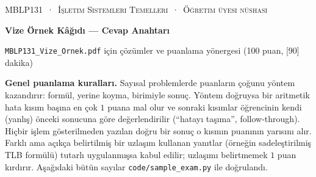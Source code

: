 \setlength{\emergencystretch}{3em}
\newcommand{\gantt}[2]{%
\begin{tikzpicture}[x=#1cm,y=1cm]
\foreach \p/\a/\b in {#2} {
  \fill[col\p] (\a,0) rectangle (\b,0.62);
  \draw[white,line width=1.2pt] (\a,0) -- (\a,0.62);
  \node[font=\small\bfseries,text=txt\p] at ({(\a+\b)/2},0.31) {\p};
  \draw[muted] (\a,0) -- (\a,-0.1) node[below,font=\scriptsize,text=muted,inner sep=1.5pt] {\a};
  \draw[muted] (\b,0) -- (\b,-0.1) node[below,font=\scriptsize,text=muted,inner sep=1.5pt] {\b};
}
\end{tikzpicture}}
\newcommand{\gen}[1]{}

\thispagestyle{empty}
\begin{tcolorbox}[enhanced,colback=dark,colframe=dark,arc=0pt,boxrule=0pt,
  left=18pt,right=18pt,top=14pt,bottom=14pt,coltext=white]
{\small\color{mint}\textsc{MBLP131 \,·\, İşletim Sistemleri Temelleri \,·\, Öğretim üyesi nüshası}}\par\smallskip
{\headfont\fontsize{22}{26}\selectfont\bfseries Vize Örnek Kâğıdı --- Cevap Anahtarı}\par\smallskip
{\small \texttt{MBLP131\_Vize\_Ornek.pdf} için çözümler ve puanlama yönergesi (100 puan, [90] dakika)}
\end{tcolorbox}

\textbf{Genel puanlama kuralları.} Sayısal problemlerde puanların çoğunu yöntem kazandırır: formül, yerine koyma, birimiyle sonuç. Yöntem doğruysa bir aritmetik hata kısım başına en çok $1$ puana mal olur ve sonraki kısımlar öğrencinin kendi (yanlış) önceki sonucuna göre değerlendirilir (``hatayı taşıma'', follow-through). Hiçbir işlem gösterilmeden yazılan doğru bir sonuç o kısmın puanının yarısını alır. Farklı ama açıkça belirtilmiş bir uzlaşım kullanan yanıtlar (örneğin sadeleştirilmiş TLB formülü) tutarlı uygulanmışsa kabul edilir; uzlaşımı belirtmemek $1$ puan kırdırır. Aşağıdaki bütün sayılar \texttt{code/sample\_exam.py} ile doğrulandı.

